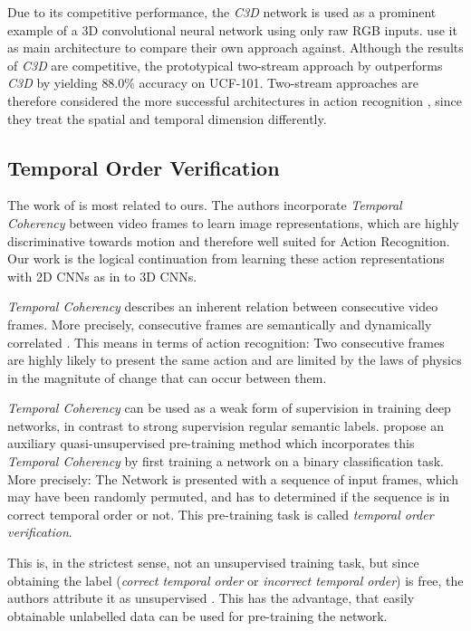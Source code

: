 Due to its competitive performance, the \textit{C3D} network is used as a prominent example of a 3D convolutional neural network using only raw RGB inputs.
\textcite{carreira_quo_2017} use it as main architecture to compare their own approach against.
Although the results of \textit{C3D} are competitive, the prototypical two-stream approach by \textcite{simonyan_two-stream_2014} outperforms \textit{C3D} by yielding $88.0\%$ accuracy on UCF-101.
Two-stream approaches are therefore considered the more successful architectures in action recognition \cite{wang_action_2015}, since they treat the spatial and temporal dimension differently.


\subsection{Temporal Order Verification}
\label{subsec:tov}

The work of \textcite{misra_shuffle_2016} is most related to ours.
The authors incorporate \textit{Temporal Coherency} between video frames to learn image representations, which are highly discriminative towards motion and therefore well suited for Action Recognition.
Our work is the logical continuation from learning these action representations with 2D CNNs as in \cite{misra_shuffle_2016} to 3D CNNs.

\textit{Temporal Coherency} describes an inherent relation between consecutive video frames.
More precisely, consecutive frames are semantically and dynamically correlated \cite{herath_going_2016}.
This means in terms of action recognition: Two consecutive frames are highly likely to present the same action and are limited by the laws of physics in the magnitute of change that can occur between them.

\textit{Temporal Coherency} can be used as a weak form of supervision in training deep networks, in contrast to strong supervision regular semantic labels.
\textcite{misra_shuffle_2016} propose an auxiliary quasi-unsupervised pre-training method which incorporates this \textit{Temporal Coherency} by first training a network on a binary classification task.
More precisely: The Network is presented with a sequence of input frames, which may have been randomly permuted, and has to determined if the sequence is in correct temporal order or not.
This pre-training task is called \textit{temporal order verification}.

This is, in the strictest sense, not an unsupervised training task, but since obtaining the label (\textit{correct temporal order} or \textit{incorrect temporal order}) is free, the authors attribute it as unsupervised \cite{misra_shuffle_2016}.
This has the advantage, that easily obtainable unlabelled data can be used for pre-training the network.

